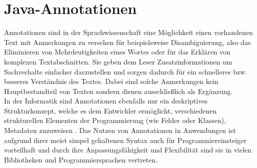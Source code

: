 \section{Java-Annotationen}
\label{java_annotationen}
\noindent Annotationen sind in der Sprachwissenschaft eine Möglichkeit einen vorhandenen Text mit Anmerkungen zu versehen für beispielsweise Disambiguierung, also das Eliminieren von Mehrdeutigkeiten eines Wortes oder für das Erklären von komplexen Textabschnitten. Sie geben dem Leser Zusatzinformationen um Sachverhalte einfacher darzustellen und sorgen dadurch für ein schnelleres bzw. besseres Verständnis des Textes. Dabei sind solche Anmerkungen kein Hauptbestandteil von Texten sondern dienen ausschließlich als Ergänzung.\\
In der Informatik sind Annotationen ebenfalls nur ein deskriptives Strukturkonzept, welche es dem Entwickler ermöglicht, verschiedenen strukturellen Elementen der Programmierung (wie Felder oder Klassen), Metadaten zuzuweisen \cite{Yu2019}. Das Nutzen von Annotationen in Anwendungen ist aufgrund ihrer meist simpel gehaltenen Syntax auch für Programmiereinsteiger vorteilhaft und durch ihre Anpassungsfähigkeit und Flexibilität sind sie in vielen Bibliotheken und Programmiersprachen vertreten.
